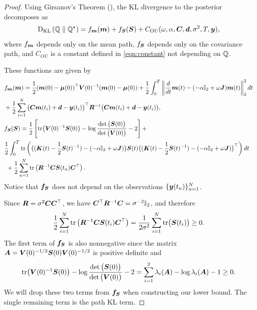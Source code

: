 \begin{proof}
Using Girsanov's Theorem (), the KL divergence to the posterior decomposes as
\begin{equation*}
    \textrm{D}_{\textrm{KL}}\left(\mathbb{Q}\;\|\;\mathbb{Q}^\star\right) = f_{\boldsymbol{m}}(\boldsymbol{m}) + f_{\boldsymbol{S}}(\boldsymbol{S}) + C_{\mathrm{OU}}(\omega, \alpha, \boldsymbol{C}, \boldsymbol{d}, \sigma^2, T, \boldsymbol{y}),
\end{equation*}
where $f_{\boldsymbol{m}}$ depends only on the mean path, $f_{\boldsymbol{S}}$ depends only on the covariance path, and $C_{\mathrm{OU}}$ is a constant defined in \cref{eqn:constant} not depending on $\mathbb{Q}$.

These functions are given by
\begin{align}\label{app:eqn:mean-cov-functions}
    &f_{\boldsymbol{m}}(\boldsymbol{m}) = \frac{1}{2}(\boldsymbol{m}(0) - \boldsymbol{\mu}(0))^\top\boldsymbol{V}(0)^{-1}(\boldsymbol{m}(0) - \boldsymbol{\mu}(0))  + \frac{1}{2} \int_0^{T} \left\| \frac{d}{dt}\boldsymbol{m}(t) - (-\alpha \mathbb{I}_2 + \omega \boldsymbol{J})\boldsymbol{m}(t) \right\|_2^2 dt \nonumber\\
    &+ \frac{1}{2} \sum_{i=1}^N\big(\boldsymbol{C} \boldsymbol{m}(t_i) + \boldsymbol{d} - \boldsymbol{y}(t_i)\big)^\top \boldsymbol{R}^{-1} \big(\boldsymbol{C} \boldsymbol{m}(t_i) + \boldsymbol{d} - \boldsymbol{y}(t_i)\big), \nonumber\\
    &f_{\boldsymbol{S}}(\boldsymbol{S}) = \frac{1}{2} \left[ \mathrm{tr}\big(\boldsymbol{V}(0)^{-1} \boldsymbol{S}(0)\big) - \log \frac{\det\big(\boldsymbol{S}(0)\big)}{\det\big(\boldsymbol{V}(0)\big)} - 2\right] + \nonumber\\
    &\frac{1}{2} \int_0^{T} \nonumber \mathrm{tr}\left(\big((\boldsymbol{K}(t) - \frac{1}{2} \boldsymbol{S}(t)^{-1} )-(-\alpha \mathbb{I}_2 + \omega \boldsymbol{J})\big) \boldsymbol{S}(t)\big((\boldsymbol{K}(t) - \frac{1}{2} \boldsymbol{S}(t)^{-1} ) -(-\alpha \mathbb{I}_2 + \omega \boldsymbol{J})\big)^\top\right) dt \nonumber\\
    &\ + \frac{1}{2} \sum_{n=1}^N \mathrm{tr}\left(\boldsymbol{R}^{-1}\boldsymbol{C} \boldsymbol{S}(t_n)\boldsymbol{C}^\top\right).
\end{align}
Notice that $\boldsymbol{f}_{\boldsymbol{S}}$ does not depend on the observations $\{\boldsymbol{y}(t_n)\}_{n=1}^N$.

Since $\boldsymbol{R}=\sigma^2 \boldsymbol{C} \boldsymbol{C}^\top$, we have $\boldsymbol{C}^\top \boldsymbol{R}^{-1} \boldsymbol{C} = \sigma^{-2}\mathbb{I}_2$,
and therefore
\begin{equation*}
    \frac{1}{2} \sum_{i=1}^N \mathrm{tr}\left(\boldsymbol{R}^{-1}\boldsymbol{C} \boldsymbol{S}(t_i)\boldsymbol{C}^\top\right) = \frac{1}{2\sigma^2}\sum_{i=1}^N \mathrm{tr}\big(\boldsymbol{S}(t_i)\big) \geq 0.
\end{equation*}
The first term of $\boldsymbol{f}_{\boldsymbol{S}}$ is also nonnegative since the matrix $\boldsymbol{A} = \boldsymbol{V}(0)^{-1/2}\boldsymbol{S}(0) \boldsymbol{V}(0)^{-1/2}$ is positive definite and
\begin{equation*}
    \mathrm{tr}\big(\boldsymbol{V}(0)^{-1} \boldsymbol{S}(0)\big) - \log \frac{\det\big(\boldsymbol{S}(0)\big)}{\det\big(\boldsymbol{V}(0)\big)} - 2 = \sum_{i=1}^2 \lambda_i(\boldsymbol{A}) - \log\lambda_i(\boldsymbol{A}) -1 \geq 0.
\end{equation*}
We will drop these two terms from $\boldsymbol{f}_{\boldsymbol{S}}$ when constructing our lower bound. 
The single remaining term is the path KL term.


\end{proof}
